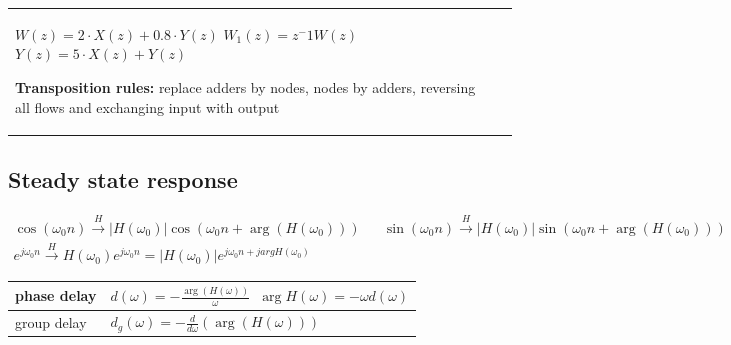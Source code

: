 \begin{longtable}{p{}p{}p{}}
	  	   $W(z) = 2\cdot X(z) + 0.8\cdot Y(z)$\newline
	  	   $W_1(z) = z^-1 W(z)$\newline
	  	   $Y(z) = 5\cdot X(z) + Y(z)$\newline
	  	   
	  	   \textbf{Transposition rules:} \newline
	  	   replace adders by nodes, \newline
	  	   nodes by adders, \newline
	  	   reversing all flows and \newline
	  	   exchanging input with output
\end{longtable}

\subsection{Steady state response}
\begin{align*}
  \cos(\omega_0 n) \xrightarrow{H} \left|H(\omega_0) \right| \cos(\omega_0 n + \arg(H(\omega_0))) &&
  \sin(\omega_0 n) \xrightarrow{H} \left|H(\omega_0) \right| \sin(\omega_0 n + \arg(H(\omega_0))) \\
  e^{j\omega_0 n} \xrightarrow{H} H(\omega_0)e^{j\omega_0 n} = |H(\omega_0)| e^{j\omega_0 n + j argH(\omega_0)}
\end{align*}


\begin{tabularx}{0.6\textwidth}{|l|X|}
	\hline
	phase delay & $d(\omega) = - \frac{\arg(H(\omega))}{\omega}$\ \qquad $\arg H(\omega) = -\omega d(\omega)$
	\\ \hline 
	group delay & $d_g(\omega) = -\frac{d}{d\omega}(\arg(H(\omega)))$	
	\\ \hline
\end{tabularx}\\ \\

